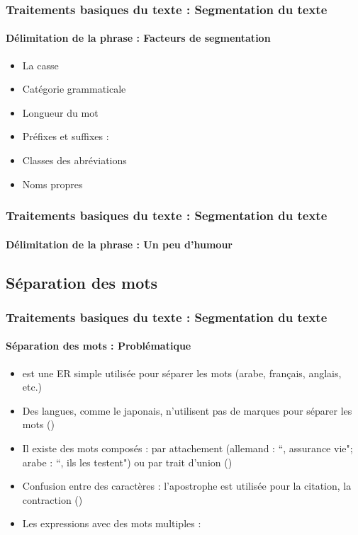 \documentclass[xcolor=table]{beamer}
\begin{document}
\begin{frame}
\frametitle{Traitements basiques du texte : Segmentation du texte}
\framesubtitle{Délimitation de la phrase : Facteurs de segmentation} 

\begin{itemize}
	\item La casse %
	\item Catégorie grammaticale %
	\item Longueur du mot %
	\item Préfixes et suffixes : 
	\item Classes des abréviations 
	\item Noms propres 
\end{itemize}

\end{frame}

\begin{frame}
\frametitle{Traitements basiques du texte : Segmentation du texte}
\framesubtitle{Délimitation de la phrase : Un peu d'humour} 


\end{frame}

\subsection{Séparation des mots}

\begin{frame}
\frametitle{Traitements basiques du texte : Segmentation du texte}
\framesubtitle{Séparation des mots : Problématique}

\begin{itemize}
	\item \expword{/[ ]+/} est une ER simple utilisée pour séparer les mots (arabe, français, anglais, etc.)
	\item Des langues, comme le japonais, n'utilisent pas de marques pour séparer les mots ()
	\item Il existe des mots composés : par attachement (allemand : ``, assurance vie"; arabe : ``, ils les testent") ou par trait d'union ()
	\item Confusion entre des caractères : l'apostrophe est utilisée pour la citation, la contraction () 
	\item Les expressions avec des mots multiples : 
\end{itemize}

\end{frame}
\end{document}
